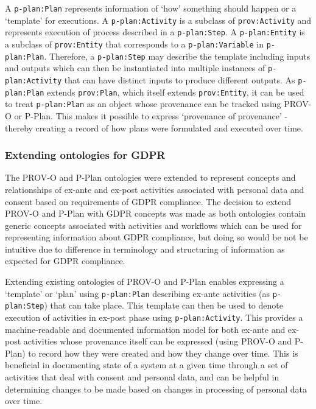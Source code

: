 A \texttt{p-plan:Plan} represents information of `how’ something should happen or a `template’ for executions. A \texttt{p-plan:Activity} is a subclass of \texttt{prov:Activity} and represents execution of process described in a \texttt{p-plan:Step}.
A \texttt{p-plan:Entity} is a subclass of \texttt{prov:Entity} that corresponds to a \texttt{p-plan:Variable} in \texttt{p-plan:Plan}. Therefore, a
\texttt{p-plan:Step} may describe the template including inputs and outputs which can
then be instantiated into multiple instances of \texttt{p-plan:Activity} that can have
distinct inputs to produce different outputs.
As \texttt{p-plan:Plan} extends \texttt{prov:Plan}, which itself extends \texttt{prov:Entity}, it can be
used to treat \texttt{p-plan:Plan} as an object whose provenance can be tracked using
PROV-O or P-Plan. This makes it possible to express `provenance of provenance' - thereby creating a record of how plans were formulated and executed over time.

\subsubsection{Extending ontologies for GDPR}
The PROV-O and P-Plan ontologies were extended to represent concepts and relationships of ex-ante and ex-post activities associated with personal data and consent based on requirements of GDPR compliance.
The decision to extend PROV-O and P-Plan with GDPR concepts was made as both ontologies contain generic concepts associated with activities and workflows which can be used for representing information about GDPR compliance, but doing so would be not be intuitive due to difference in terminology and structuring of information as expected for GDPR compliance.

Extending existing ontologies of PROV-O and P-Plan enables expressing a `template'
or `plan' using \texttt{p-plan:Plan} describing ex-ante activities (as \texttt{p-plan:Step}) that can take place. This template can then be used to denote execution of activities in ex-post phase using \texttt{p-plan:Activity}.
This provides a machine-readable and documented information model for both ex-ante and ex-post activities whose provenance itself can be expressed (using PROV-O and P-Plan) to record how they were created and how they  change over time.
This is beneficial in documenting state of a system at a given time through a set of activities that deal with consent and personal data, and
can be helpful in determining changes to be made based on changes in processing of personal data over time.

